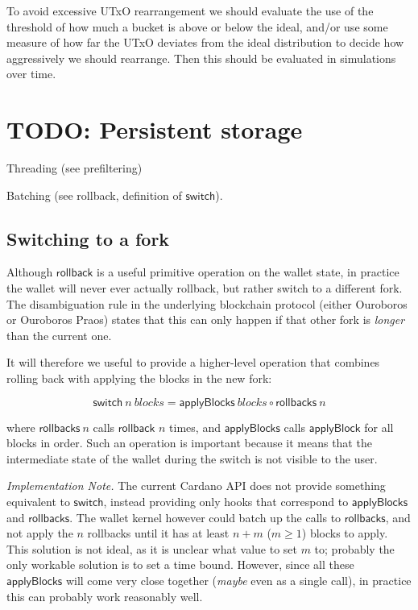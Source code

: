\documentclass{article}
\theoremstyle{definition}{
  \newtheorem{lemma}{Lemma}[section] %
  \newtheorem{definition}[lemma]{Definition}
}
\theoremstyle{theorem}{
  \newtheorem{invariant}[lemma]{Invariant}
  \newtheorem{proofobligation}[lemma]{Proof Obligation}
}
\numberwithin{equation}{lemma}
\begin{document}
To avoid excessive UTxO rearrangement we should evaluate the use of the
threshold of how much a bucket is above or below the ideal, and/or use some
measure of how far the UTxO deviates from the ideal distribution to decide
how aggressively we should rearrange. Then this should be evaluated in
simulations over time.

\section{TODO: Persistent storage}

Threading (see prefiltering)

Batching (see rollback, definition of $\mathsf{switch}$).

\subsection{Switching to a fork}

Although $\mathsf{rollback}$ is a useful primitive operation on the wallet
state, in practice the wallet will never ever actually rollback, but rather
switch to a different fork. The disambiguation rule in the underlying blockchain
protocol (either Ouroboros or Ouroboros Praos) states that this can only happen
if that other fork is \emph{longer} than the current one.

It will therefore we useful to provide a higher-level operation that combines
rolling back with applying the blocks in the new fork:

\begin{equation}
\mathsf{switch} ~ n ~ \mathit{blocks} = \mathsf{applyBlocks} ~ \mathit{blocks} \circ \mathsf{rollbacks} ~ n
\end{equation}

where $\mathsf{rollbacks} ~ n$ calls $\mathsf{rollback}$ $n$ times, and
$\mathsf{applyBlocks}$ calls $\mathsf{applyBlock}$ for all blocks in order.
Such an operation is important because it means that the intermediate state
of the wallet during the switch is not visible to the user.

\emph{Implementation Note.} The current Cardano API does not provide something
equivalent to $\mathsf{switch}$, instead providing only hooks that correspond to
$\mathsf{applyBlocks}$ and $\mathsf{rollbacks}$. The wallet kernel however could
batch up the calls to $\mathsf{rollbacks}$, and not apply the $n$ rollbacks
until it has at least $n + m$ ($m \ge 1$) blocks to apply. This solution is not
ideal, as it is unclear what value to set $m$ to; probably the only workable
solution is to set a time bound. However, since all these $\mathsf{applyBlocks}$
will come very close together (\emph{maybe} even as a single call), in practice
this can probably work reasonably well.
\end{document}
